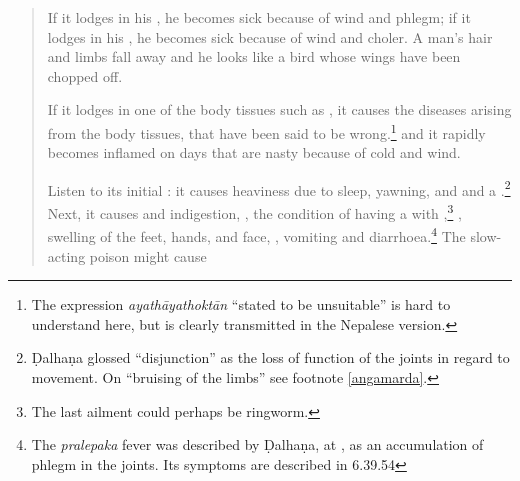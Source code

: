 \begin{translation}
\begin{verse}
        
        



        \item[28]
        If it lodges in his , he becomes sick because of wind 
        and phlegm; if it lodges in his , he becomes sick 
        because of  wind and 
        choler.  A man's hair and limbs fall away and he looks like a
        bird whose wings have been chopped off.
        \item[29a--c]
        If it lodges in one of the body tissues such as 
        , it causes the diseases arising
        from the body tissues, that have been said to be wrong.\footnote{The 
        expression \emph{ayathāyathoktān} “stated to be unsuitable” is hard to 
        understand here, but is clearly transmitted in the Nepalese version.}
        and it rapidly becomes inflamed on days that are nasty
        because of cold and wind.
        
        \item[29d--31] Listen to its initial : it causes
heaviness due to sleep, yawning,  and
 and a .\footnote{Ḍalhaṇa  glossed “disjunction” as the
	    loss of function of the joints in regard to movement. On  ``bruising of the limbs'' see footnote \ref{angamarda}.} Next, it causes
 and indigestion, , the condition of having a  with
,\footnote{The last ailment could perhaps be
ringworm.} %
, swelling of the feet, hands, and
face, , vomiting and
diarrhoea.\footnote{The \emph{pralepaka} fever was described by Ḍalhaṇa,
at , as an accumulation of phlegm in the joints.  Its
symptoms are described in 6.39.54} The slow-acting poison might cause
        

\end{verse}
\end{translation}
